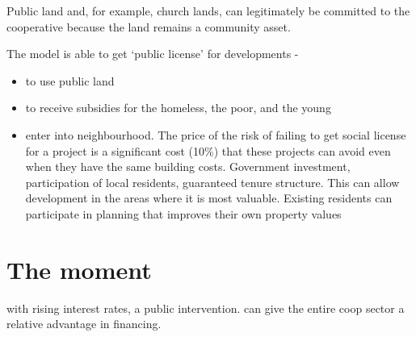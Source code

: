 Public land and, for example, church lands, can legitimately be committed to the cooperative because the land remains a community asset.

The model is able to get `public license' for developments - \begin{itemize}
    \item to use public land
    \item to receive subsidies for the homeless, the poor, and the young
    \item enter into neighbourhood. The price of the risk of failing to get social license for a project is a significant cost (10\%) that these projects can avoid even when they have the same building costs.  Government investment, participation of local residents, guaranteed  tenure structure. This can allow development in the areas where it is most valuable. Existing residents can participate in planning that improves their own property values
\end{itemize}

\section{The moment}
with rising interest rates, a public intervention. can give the entire coop sector a relative advantage in financing. 






